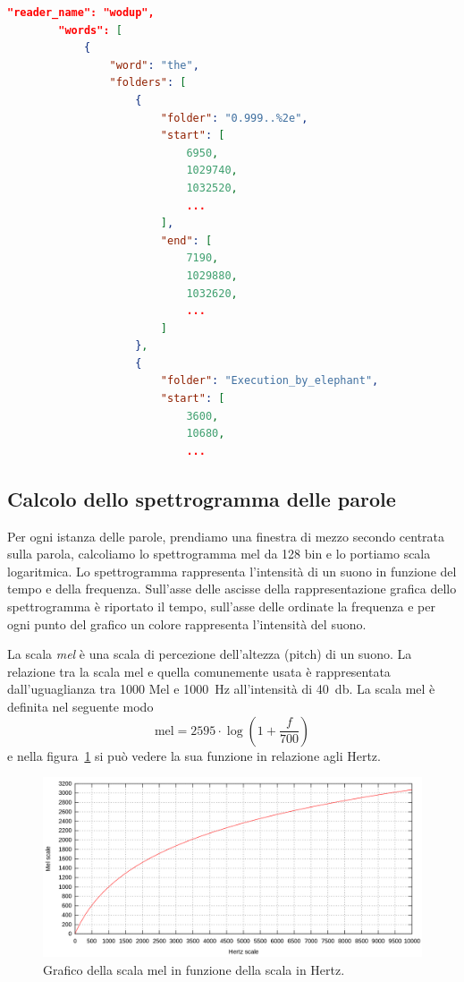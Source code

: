 \documentclass[12pt,a4paper,titlepage]{article}
\begin{document}
\begin{lstlisting}[language=iPython,firstnumber=1, caption=words\_per\_reader.py, label=words_per_reader,captionpos=b]
\end{lstlisting}
	
\begin{lstlisting}[language=json,firstnumber=1, caption=Formato del file readers\_words.json, label=readers_words,captionpos=b]
"reader_name": "wodup",
		"words": [
			{
				"word": "the",
				"folders": [
					{
						"folder": "0.999..%2e",
						"start": [
							6950,
							1029740,
							1032520,
							...
						],
						"end": [
							7190,
							1029880,
							1032620,
							...
						]
					},
					{
						"folder": "Execution_by_elephant",
						"start": [
							3600,
							10680,
							...
\end{lstlisting}

\subsection{Calcolo dello spettrogramma delle parole}
\label{subsec:spettrogramma}
Per ogni istanza delle parole, prendiamo una finestra di mezzo secondo centrata sulla parola, calcoliamo lo spettrogramma mel da 128 bin e lo portiamo scala logaritmica. Lo spettrogramma rappresenta l'intensità di un suono in funzione del tempo e della frequenza. Sull'asse delle ascisse della rappresentazione grafica dello spettrogramma è riportato il tempo, sull'asse delle ordinate la frequenza e per ogni punto del grafico un colore rappresenta l'intensità del suono.

La scala \textit{mel} è una scala di percezione dell'altezza (pitch) di un suono. La relazione tra la scala mel e quella comunemente usata è rappresentata dall'uguaglianza tra 1000 Mel e \SI{1000}{\hertz} all'intensità di \SI{40}{\decibel}. La scala mel è definita nel seguente modo
\begin{equation}
\text{mel} = 2595\cdot \log \left(1 + \dfrac{f}{700} \right)
\end{equation}
e nella figura~\ref{fig:mel_plot} si può vedere la sua funzione in relazione agli Hertz.
\begin{figure}[h]
	\centering	
	\includegraphics[width=1\textwidth]{Immagini/mel_plot}
	\caption{Grafico della scala mel in funzione della scala in Hertz.}
	\label{fig:mel_plot}
\end{figure}
\end{document}
